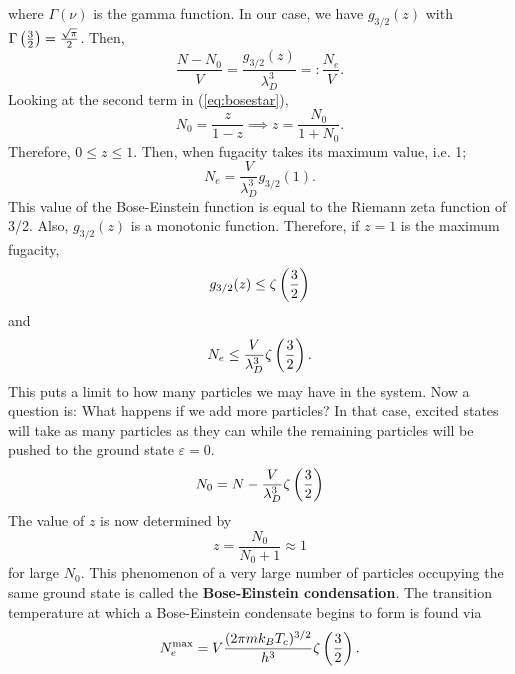         where $\Gamma(\nu)$ is the gamma function. In our case, we have $g_{3/2}(z)$ with $\Gamma\left( \frac{3}{2} \right)=\frac{\sqrt{\pi}}{2}$. Then,
        \begin{equation}
            \frac{N-N_0}{V}=\frac{g_{3/2}(z)}{\lambda_D^3} =: \frac{N_e}{V}.
        \end{equation}
        Looking at the second term in (\ref{eq:bosestar}), 
        \begin{equation}
            N_0 = \frac{z}{1-z}\implies z = \frac{N_0}{1+N_0}.
        \end{equation}
        Therefore, $0\leq z \leq 1$. Then, when fugacity takes its maximum value, i.e. 1;
        \begin{equation}
            N_e = \frac{V}{\lambda_D^3}g_{3/2}(1).
        \end{equation}
        This value of the Bose-Einstein function is equal to the Riemann zeta function of 3/2. Also, $g_{3/2}(z)$ is a monotonic function. Therefore, if $z=1$ is the maximum fugacity, 
        \begin{equation}
            g_{3/2}(z)\leq \zeta\left( \frac{3}{2} \right)
        \end{equation}
        and 
        \begin{equation}
            N_e \leq \frac{V}{\lambda_D^3}\zeta\left( \frac{3}{2} \right).
        \end{equation}
        This puts a limit to how many particles we may have in the system. Now a question is: What happens if we add more particles? In that case, excited states will take as many particles as they can while the remaining particles will be pushed to the ground state $\varepsilon=0$.
        \begin{equation}
            N_0 = N - \frac{V}{\lambda_D^3}\zeta\left( \frac{3}{2} \right)
        \end{equation}
        The value of $z$ is now determined by
        \begin{equation}
            z = \frac{N_0}{N_0+1}\approx 1 
        \end{equation}
        for large $N_0.$ This phenomenon of a very large number of particles occupying the same ground state is called the \textbf{Bose-Einstein condensation}. The transition temperature at which a Bose-Einstein condensate begins to form is found via 
        \begin{equation}
            N_e^\mathrm{max} = V\frac{(2\pi mk_BT_c)^{3/2}}{h^3}\zeta\left( \frac{3}{2} \right).
        \end{equation}

